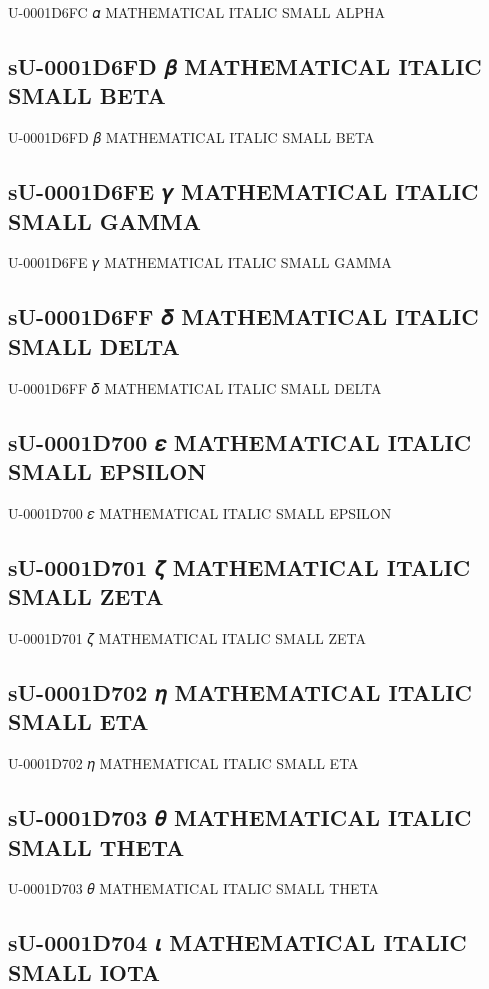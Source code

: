 U-0001D6FC 𝛼 MATHEMATICAL ITALIC SMALL ALPHA

\subsection{sU-0001D6FD 𝛽 MATHEMATICAL ITALIC SMALL BETA}

U-0001D6FD 𝛽 MATHEMATICAL ITALIC SMALL BETA

\subsection{sU-0001D6FE 𝛾 MATHEMATICAL ITALIC SMALL GAMMA}

U-0001D6FE 𝛾 MATHEMATICAL ITALIC SMALL GAMMA

\subsection{sU-0001D6FF 𝛿 MATHEMATICAL ITALIC SMALL DELTA}

U-0001D6FF 𝛿 MATHEMATICAL ITALIC SMALL DELTA

\subsection{sU-0001D700 𝜀 MATHEMATICAL ITALIC SMALL EPSILON}

U-0001D700 𝜀 MATHEMATICAL ITALIC SMALL EPSILON

\subsection{sU-0001D701 𝜁 MATHEMATICAL ITALIC SMALL ZETA}

U-0001D701 𝜁 MATHEMATICAL ITALIC SMALL ZETA

\subsection{sU-0001D702 𝜂 MATHEMATICAL ITALIC SMALL ETA}

U-0001D702 𝜂 MATHEMATICAL ITALIC SMALL ETA

\subsection{sU-0001D703 𝜃 MATHEMATICAL ITALIC SMALL THETA}

U-0001D703 𝜃 MATHEMATICAL ITALIC SMALL THETA

\subsection{sU-0001D704 𝜄 MATHEMATICAL ITALIC SMALL IOTA}

